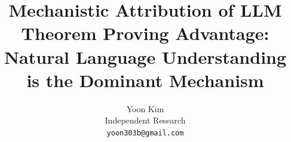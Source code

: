 \documentclass[11pt,twocolumn]{article}
\title{Mechanistic Attribution of LLM Theorem Proving Advantage: \\
       Natural Language Understanding is the Dominant Mechanism}
\author{Yoon Kim \\
        Independent Research \\
        \texttt{yoon303b@gmail.com}}
\date{}
\begin{document}
\maketitle

\begin{abstract}

\end{abstract}











\end{document}
